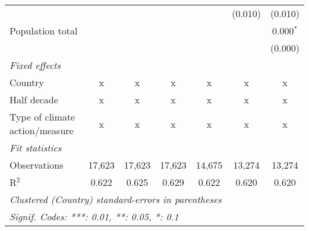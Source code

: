 \begin{tabular}{lcccccc}
                                                                                &         &                &                &                & (0.010)        & (0.010)\\   
   Population total                                                             &         &                &                &                &                & 0.000$^{*}$\\   
                                                                                &         &                &                &                &                & (0.000)\\   
   \emph{Fixed effects}\\
   Country                                                                      & x       & x              & x              & x              & x              & x\\  
   Half decade                                                                  & x       & x              & x              & x              & x              & x\\  
   Type of climate action/measure                                               & x       & x              & x              & x              & x              & x\\  
   \midrule \emph{Fit statistics}\\
   Observations                                                                 & 17,623  & 17,623         & 17,623         & 14,675         & 13,274         & 13,274\\  
   R$^2$                                                                        & 0.622   & 0.625          & 0.629          & 0.622          & 0.620          & 0.620\\  
   \midrule
   \multicolumn{7}{l}{\emph{Clustered (Country) standard-errors in parentheses}}\\
   \multicolumn{7}{l}{\emph{Signif. Codes: ***: 0.01, **: 0.05, *: 0.1}}\\
\end{tabular}
\par\endgroup


